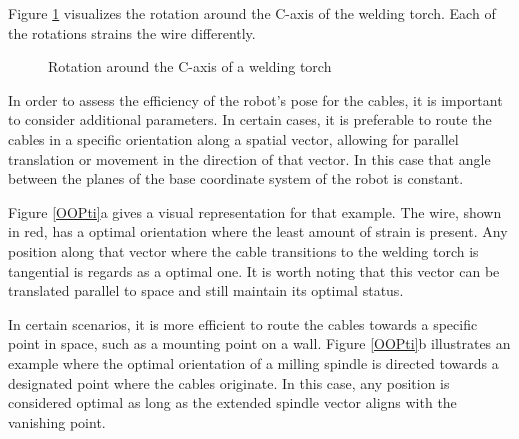 Figure \ref{rot} visualizes the rotation around the C-axis of the welding torch. Each of the rotations strains the wire differently.

\begin{figure}[H]%
	\centering
	\qquad
	\caption{Rotation around the C-axis of a welding torch }%
	\label{rot}%
\end{figure}
 
In order to assess the efficiency of the robot's pose for the cables, it is important to consider additional parameters. In certain cases, it is preferable to route the cables in a specific orientation along a spatial vector, allowing for parallel translation or movement in the direction of that vector. In this case that angle between the planes of the base coordinate system of the robot is constant.

Figure \ref{OOPti}a gives a visual representation for that example. The wire, shown in red, has a optimal orientation where the least amount of strain is present. Any position along that vector where the cable transitions to the welding torch is tangential is regards as a optimal one. It is worth noting that this vector can be translated parallel to space and still maintain its optimal status.

In certain scenarios, it is more efficient to route the cables towards a specific point in space, such as a mounting point on a wall. Figure \ref{OOPti}b illustrates an example where the optimal orientation of a milling spindle is directed towards a designated point where the cables originate. In this case, any position is considered optimal as long as the extended spindle vector aligns with the vanishing point.



